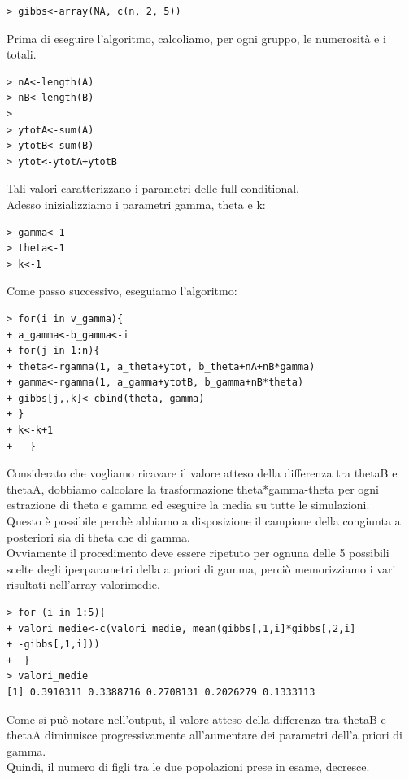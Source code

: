 \begin{enumerate}
\begin{verbatim}
> gibbs<-array(NA, c(n, 2, 5))
\end{verbatim}

Prima di eseguire l'algoritmo, calcoliamo, per ogni gruppo, le numerosità e i totali.
\begin{verbatim}
> nA<-length(A)
> nB<-length(B)
> 
> ytotA<-sum(A)
> ytotB<-sum(B)
> ytot<-ytotA+ytotB
\end{verbatim}

Tali valori caratterizzano i parametri delle full conditional.\\

Adesso inizializziamo i parametri gamma, theta e k: 
\begin{verbatim}
> gamma<-1
> theta<-1
> k<-1
\end{verbatim}

Come passo successivo, eseguiamo l'algoritmo:
\begin{verbatim}
> for(i in v_gamma){
+ a_gamma<-b_gamma<-i
+ for(j in 1:n){
+ theta<-rgamma(1, a_theta+ytot, b_theta+nA+nB*gamma)
+ gamma<-rgamma(1, a_gamma+ytotB, b_gamma+nB*theta)
+ gibbs[j,,k]<-cbind(theta, gamma)
+ }
+ k<-k+1
+   }
\end{verbatim}

Considerato che vogliamo ricavare il valore atteso della differenza tra thetaB e thetaA, dobbiamo calcolare la trasformazione theta*gamma-theta per ogni estrazione di theta e gamma ed eseguire la media su tutte le simulazioni. \\
Questo è possibile perchè abbiamo a disposizione il campione della congiunta a posteriori sia di theta che di gamma. \\
Ovviamente il procedimento deve essere ripetuto per ognuna delle 5 possibili scelte degli iperparametri della a priori di gamma, perciò memorizziamo i vari risultati nell'array valori\textunderscore medie.

\begin{verbatim} 
> for (i in 1:5){
+ valori_medie<-c(valori_medie, mean(gibbs[,1,i]*gibbs[,2,i]
+ -gibbs[,1,i]))
+  }
> valori_medie
[1] 0.3910311 0.3388716 0.2708131 0.2026279 0.1333113
\end{verbatim}

Come si può notare nell'output, il valore atteso della differenza tra thetaB e thetaA diminuisce 
progressivamente all'aumentare dei parametri dell'a priori di gamma. \\
Quindi, il numero di figli tra le due popolazioni prese in esame, decresce.


\end{enumerate}
